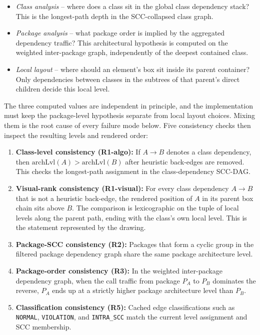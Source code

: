 \documentclass[a4paper,twoside]{article}
\begin{document}
\begin{itemize}
  \item \emph{Class analysis} -- where does a class sit in the global class
        dependency stack? This is the longest-path depth in the
        SCC-collapsed class graph.
  \item \emph{Package analysis} -- what package order is implied by the
        aggregated dependency traffic? This architectural hypothesis is
        computed on the weighted inter-package graph, independently of the
        deepest contained class.
  \item \emph{Local layout} -- where should an element's box sit inside its
        parent container? Only dependencies between classes in the subtrees of
        that parent's direct children decide this local level.
\end{itemize}

The three computed values are independent in principle, and the implementation
must keep the package-level hypothesis separate from local layout choices.
Mixing them is the root cause of every failure mode below. Five consistency
checks then inspect the resulting levels and rendered order:

\begin{enumerate}
  \item \textbf{Class-level consistency (R1-algo):} If
        $A \rightarrow B$ denotes a class dependency, then
        $\text{archLvl}(A) > \text{archLvl}(B)$ after heuristic back-edges are
        removed. This checks the longest-path assignment in the
        class-dependency SCC-DAG.
  \item \textbf{Visual-rank consistency (R1-visual):} For every class
        dependency $A \rightarrow B$ that is not a heuristic back-edge, the
        rendered position of $A$ in its parent box chain sits above $B$. The
        comparison is lexicographic on the tuple of local levels along
        the parent path, ending with the class's own local level. This is the
        statement represented by the drawing.
  \item \textbf{Package-SCC consistency (R2):} Packages that form a cyclic
        group in the filtered package dependency graph share the same package
        architecture level.
  \item \textbf{Package-order consistency (R3):} In the weighted inter-package
        dependency graph, when the call traffic from package $P_A$ to $P_B$
        dominates the reverse, $P_A$ ends up at a strictly higher package
        architecture level than $P_B$.
  \item \textbf{Classification consistency (R5):} Cached edge classifications
        such as \texttt{NORMAL}, \texttt{VIOLATION}, and \texttt{INTRA\_SCC}
        match the current level assignment and SCC membership.
\end{enumerate}
\end{document}
